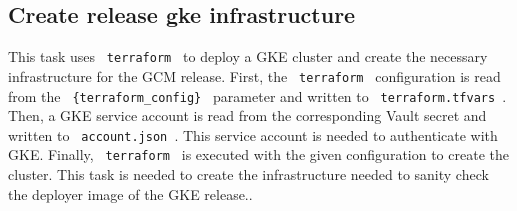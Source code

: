 \subsection{Create release gke infrastructure}\label{subsec:create-release-gke-infrastructure}

This task uses \verb| terraform | to deploy a GKE cluster and create the necessary infrastructure for the GCM release.
First, the \verb| terraform | configuration is read from the \verb| {terraform_config} | parameter and written to \verb| terraform.tfvars |.
Then, a GKE service account is read from the corresponding Vault secret and written to \verb| account.json |.
This service account is needed to authenticate with GKE.
Finally, \verb| terraform | is executed with the given configuration to create the cluster.
This task is needed to create the infrastructure needed to sanity check the deployer image of the GKE release..
